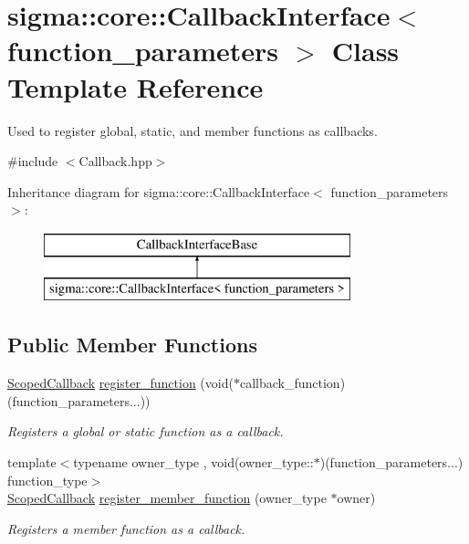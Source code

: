 \hypertarget{classsigma_1_1core_1_1_callback_interface}{}\section{sigma\+:\+:core\+:\+:Callback\+Interface$<$ function\+\_\+parameters $>$ Class Template Reference}
\label{classsigma_1_1core_1_1_callback_interface}


Used to register global, static, and member functions as callbacks.  




{\ttfamily \#include $<$Callback.\+hpp$>$}

Inheritance diagram for sigma\+:\+:core\+:\+:Callback\+Interface$<$ function\+\_\+parameters $>$\+:\begin{figure}[H]
\begin{center}
\leavevmode
\includegraphics[height=2.000000cm]{classsigma_1_1core_1_1_callback_interface}
\end{center}
\end{figure}
\subsection*{Public Member Functions}
\begin{DoxyCompactItemize}
\item 
\hyperlink{classsigma_1_1core_1_1_scoped_callback}{Scoped\+Callback} \hyperlink{classsigma_1_1core_1_1_callback_interface_a1117c0ac1a539abfe254e2f12dc1880d}{register\+\_\+function} (void($\ast$callback\+\_\+function)(function\+\_\+parameters...))
\begin{DoxyCompactList}\small\item\em Registers a global or static function as a callback. \end{DoxyCompactList}\item 
{\footnotesize template$<$typename owner\+\_\+type , void(owner\+\_\+type\+::$\ast$)(function\+\_\+parameters...) function\+\_\+type$>$ }\\\hyperlink{classsigma_1_1core_1_1_scoped_callback}{Scoped\+Callback} \hyperlink{classsigma_1_1core_1_1_callback_interface_aaa44a699001122a4828013af440345c7}{register\+\_\+member\+\_\+function} (owner\+\_\+type $\ast$owner)
\begin{DoxyCompactList}\small\item\em Registers a member function as a callback. \end{DoxyCompactList}\end{DoxyCompactItemize}
